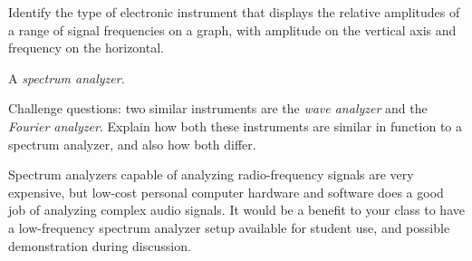 

Identify the type of electronic instrument that displays the relative amplitudes of a range of signal frequencies on a graph, with amplitude on the vertical axis and frequency on the horizontal.







A {\it spectrum analyzer}.

\vskip 10pt

Challenge questions: two similar instruments are the {\it wave analyzer} and the {\it Fourier analyzer}.  Explain how both these instruments are similar in function to a spectrum analyzer, and also how both differ.







Spectrum analyzers capable of analyzing radio-frequency signals are very expensive, but low-cost personal computer hardware and software does a good job of analyzing complex audio signals.  It would be a benefit to your class to have a low-frequency spectrum analyzer setup available for student use, and possible demonstration during discussion.




